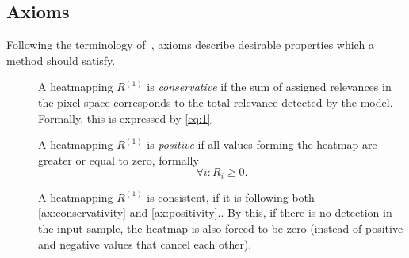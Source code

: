 \subsection{Axioms}
Following the terminology of~\cite{Sundararajan.2017}, axioms describe desirable properties which a method should satisfy.

\begin{description}
    \item[] A heatmapping \(R^{(1)}\) is \textit{conservative} if the sum of assigned relevances in the pixel space corresponds to the total relevance detected by the model.\cite{Montavon.2017} Formally, this is expressed by \cref{eq:1}.
    \item[] A heatmapping \(R^{(1)}\) is \textit{positive} if all values forming the heatmap are greater or equal to zero\cite{Montavon.2017}, formally
    \[
        \forall i: R_i \geq 0.
    \]
    \item[] A heatmapping \(R^{(1)}\) is consistent, if it is following both \ref{ax:conservativity} and \ref{ax:positivity}.\cite{Montavon.2017}. By this, if there is no detection in the input-sample, the heatmap is also forced to be zero (instead of positive and negative values that cancel each other)\cite{Montavon.2017}.
\end{description}
%
%
